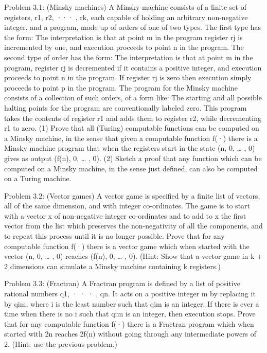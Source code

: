\documentclass{article}
\newcommand{\0}{{$|0\rangle$}}
\newcommand{\1}{{$|1\rangle$}}
\newcommand{\2}{\frac{1}{\sqrt{2}}}
\begin{document}
Problem 3.1: (Minsky machines) A Minsky machine consists of a finite set of registers, r1, r2, ··· , rk, each capable of holding an arbitrary non-negative integer, and a program, made up of orders of one of two types. The first type has the form: The interpretation is that at point m in the program register rj is incremented by one, and execution proceeds to point n in the program. The second type of order has the form: The interpretation is that at point m in the program, register rj is decremented if it contains a positive integer, and execution proceeds to point n in the program. If register rj is zero then execution simply proceeds to point p in the program. The program for the Minsky machine consists of a collection of such orders, of a form like: The starting and all possible halting points for the program are conventionally labeled zero. This program takes the contents of register r1 and adds them to register r2, while decrementing r1 to zero. (1) Prove that all (Turing) computable functions can be computed on a Minsky machine, in the sense that given a computable function f(·) there is a Minsky machine program that when the registers start in the state (n, 0, … , 0) gives as output (f(n), 0, … , 0). (2) Sketch a proof that any function which can be computed on a Minsky machine, in the sense just defined, can also be computed on a Turing machine.

Problem 3.2: (Vector games) A vector game is specified by a finite list of vectors, all of the same dimension, and with integer co-ordinates. The game is to start with a vector x of non-negative integer co-ordinates and to add to x the first vector from the list which preserves the non-negativity of all the components, and to repeat this process until it is no longer possible. Prove that for any computable function f(·) there is a vector game which when started with the vector (n, 0, … , 0) reaches (f(n), 0, … , 0). (Hint: Show that a vector game in k + 2 dimensions can simulate a Minsky machine containing k registers.)

Problem 3.3: (Fractran) A Fractran program is defined by a list of positive rational numbers q1, · · · , qn. It acts on a positive integer m by replacing it by qim, where i is the least number such that qim is an integer. If there is ever a time when there is no i such that qim is an integer, then execution stops. Prove that for any computable function f(·) there is a Fractran program which when started with 2n reaches 2f(n) without going through any intermediate powers of 2. (Hint: use the previous problem.)
\end{document}
